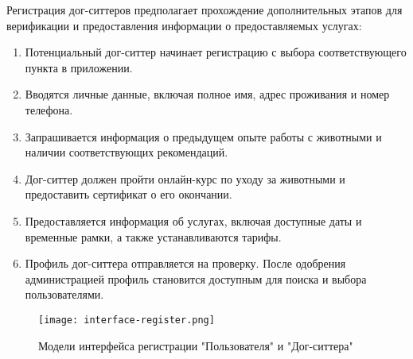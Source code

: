 Регистрация дог-ситтеров предполагает прохождение дополнительных этапов для верификации и предоставления информации о предоставляемых услугах:
\begin{enumerate}
    \item Потенциальный дог-ситтер начинает регистрацию с выбора соответствующего пункта в приложении.
    \item Вводятся личные данные, включая полное имя, адрес проживания и номер телефона.
    \item Запрашивается информация о предыдущем опыте работы с животными и наличии соответствующих рекомендаций.
    \item Дог-ситтер должен пройти онлайн-курс по уходу за животными и предоставить сертификат о его окончании.
    \item Предоставляется информация об услугах, включая доступные даты и временные рамки, а также устанавливаются тарифы.
    \item Профиль дог-ситтера отправляется на проверку. После одобрения администрацией профиль становится доступным для поиска и выбора пользователями.
\end{enumerate}


\begin{figure}[h!]
    \texttt{[image: interface-register.png]}
    \caption{Модели интерфейса регистрации "Пользователя" и "Дог-ситтера"}
    \label{fig:register}
\end{figure}



